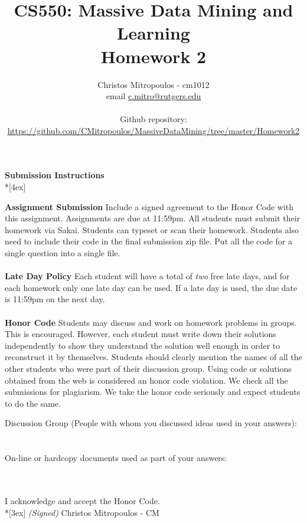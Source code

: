 \documentclass[11pt]{article}
\title{\LARGE{\bf \textsf{CS550: Massive Data Mining and Learning}}\\ {\bf \textsf{Homework 2}}}
\author{Christos Mitropoulos - cm1012 \\ email \href{mailto:c.mitro@rutgers.edu}{c.mitro@rutgers.edu} \\\\ Github repository:\\ \href{https://github.com/CMitropoulos/MassiveDataMining/tree/master/Homework2}{https://github.com/CMitropoulos/MassiveDataMining/tree/master/Homework2}}
\date{}
\begin{document}
\begin{titlepage}
\maketitle
\end{titlepage}

\pagebreak[4]
\begin{center}
\LARGE{\bf \textsf{Submission Instructions}} \\*[4ex]
\end{center}

\textbf{Assignment Submission } Include a signed agreement to the Honor Code with this assignment. Assignments are due at 11:59pm. All students must submit their homework via Sakai. Students can typeset or scan their homework. Students also need to include their code in the final submission zip file. Put all the code for a single question into a single file. 
\\
\\
\textbf{Late Day Policy } Each student will have a total of {\em two} free late days, and for each homework only one late day can be used. If a late day is used, the due date is 11:59pm on the next day.
\\
\\
\textbf{Honor Code } Students may discuss and work on homework problems in groups. This is encouraged. However, each student must write down their solutions independently to show they understand the solution well enough in order to reconstruct it by themselves.  Students should clearly mention the names of all the other students who were part of their discussion group. Using code or solutions obtained from the web is considered an honor code violation. We check all the submissions for plagiarism. We take the honor code seriously and expect students to do the same. 

\vfill
\vfill

Discussion Group (People with whom you discussed ideas used in your answers): \\\\\\
On-line or hardcopy documents used as part of your answers: \\\\\\
\vfill

\vfill

I acknowledge and accept the Honor Code.\\*[3ex]
\bigskip
\textit{(Signed)} Christos Mitropoulos - CM
\end{document}
